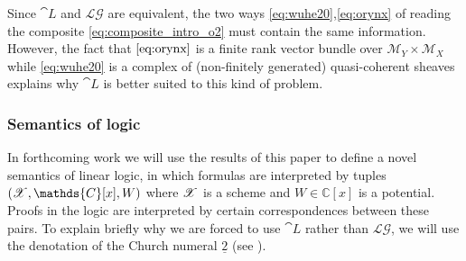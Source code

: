 \documentclass[english,letter paper,12pt,leqno]{article}
\theoremstyle{example}
\numberwithin{equation}{section}
\def\LG{\mathcal{LG}}
\def\nC{\mathds{C}}
\begin{document}
Since $\cat{L}$ and $\LG$ are equivalent, the two ways \eqref{eq:wuhe20},\eqref{eq:orynx} of reading the composite \eqref{eq:composite_intro_o2} must contain the same information. However, the fact that $\eqref{eq:orynx}$ is a finite rank vector bundle over $\mathscr{M}_Y \times \mathscr{M}_X$ while \eqref{eq:wuhe20} is a complex of (non-finitely generated) quasi-coherent sheaves explains why $\cat{L}$ is better suited to this kind of problem.


\subsubsection{Semantics of logic}

In forthcoming work we will use the results of this paper to define a novel semantics of linear logic, in which formulas are interpreted by tuples $(\md{X}, \nC[x], W)$ where $\mathscr{X}$ is a scheme and $W \in \nC[x]$ is a potential. Proofs in the logic are interpreted by certain correspondences between these pairs. To explain briefly why we are forced to use $\cat{L}$ rather than $\LG$, we will use the denotation of the Church numeral $\underline{2}$ (see \cite{murfet_ll}).
\end{document}
